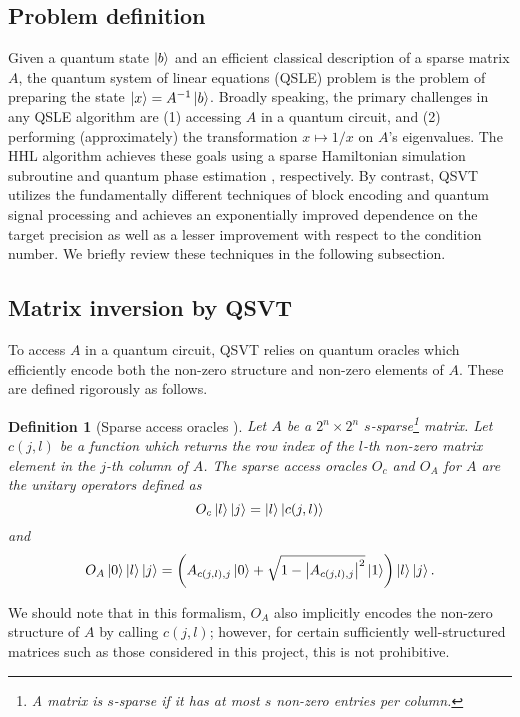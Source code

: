 \documentclass[10pt, twocolumn]{article}
\newtheorem{definition}[theorem]{Definition}
\begin{document}
\subsection{Problem definition}

Given a quantum state $\ket{b}$ and an efficient classical description of a sparse matrix $A$, the quantum system of linear equations (QSLE) problem is the problem of preparing the state $\ket{x} = A^{-1} \ket{b}$. Broadly speaking, the primary challenges in any QSLE algorithm are (1) accessing $A$ in a quantum circuit, and (2) performing (approximately) the transformation $x \mapsto 1/x$ on $A$'s eigenvalues. The HHL algorithm \cite{harrow2009quantum} achieves these goals using a sparse Hamiltonian simulation subroutine \cite{berry2007efficient} and quantum phase estimation \cite{kitaev1995quantum}, respectively. By contrast, QSVT utilizes the fundamentally different techniques of block encoding \cite{gilyen2019quantum} and quantum signal processing \cite{low2017optimal} and achieves an exponentially improved dependence on the target precision as well as a lesser improvement with respect to the condition number. We briefly review these techniques in the following subsection.

\subsection{Matrix inversion by QSVT}

To access $A$ in a quantum circuit, QSVT relies on quantum oracles which efficiently encode both the non-zero structure and non-zero elements of $A$. These are defined rigorously as follows.

\begin{definition}[Sparse access oracles \cite{camps2203explicit}]
	\label{def::sparse_access_oracles}
	Let $A$ be a $2^n \times 2^n$ $s$-sparse\footnote{A matrix is \textit{$s$-sparse} if it has at most $s$ non-zero entries per column.} matrix. Let $c(j,l)$ be a function which returns the row index of the $l$-th non-zero matrix element in the $j$-th column of $A$. The sparse access oracles $O_c$ and $O_A$ for $A$ are the unitary operators defined as
	\[
		O_c \ket{l}\ket{j} = \ket{l}\ket{c(j, l)}
	\]
	and
	\[
		O_A \ket{0}\ket{l}\ket{j} = \left( A_{c(j, l), j} \ket{0} + \sqrt{1 - \abs{A_{c(j, l), j}}^2 } \ket{1} \right) \ket{l} \ket{j}.
	\]
\end{definition}

We should note that in this formalism, $O_A$ also implicitly encodes the non-zero structure of $A$ by calling $c(j, l)$; however, for certain sufficiently well-structured matrices such as those considered in this project, this is not prohibitive.
\end{document}
